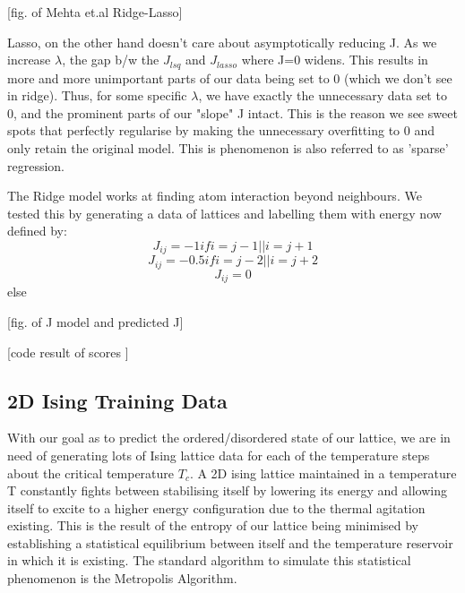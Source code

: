 [fig. of Mehta et.al Ridge-Lasso]

Lasso, on the other hand doesn't care about asymptotically reducing J. As we increase \(\lambda\), the gap b/w the \(J_{lsq}\) and \(J_{lasso}\) where J=0 widens. This results in more and more unimportant parts of our data being set to 0 (which we don't see in ridge). Thus, for some specific \(\lambda\), we have exactly the unnecessary data set to 0, and the prominent parts of our "slope" J intact. This is the reason we see sweet spots that perfectly regularise by making the unnecessary overfitting to 0 and only retain the original model. This is phenomenon is also referred to as 'sparse' regression.

The Ridge model works at finding atom interaction beyond neighbours. We tested this by generating a data of lattices and labelling them with energy now defined by: 
\[J_{ij}=-1 if i=j-1 || i=j+1\]
\[J_{ij}=-0.5 if i=j-2 || i=j+2\]
\[J_{ij}=0\] else

[fig. of J model and predicted J]

[code result of scores ]

\subsection{2D Ising Training Data}
With our goal as to predict the ordered/disordered state of our lattice, we are in need of generating lots of Ising lattice data for each of the temperature steps about the critical temperature \(T_c\). A 2D ising lattice maintained in a temperature T constantly fights between stabilising itself by lowering its energy and allowing itself to excite to a higher energy configuration due to the thermal agitation existing. This is the result of the entropy of our lattice being minimised by establishing a statistical equilibrium between itself and the temperature reservoir in which it is existing. The standard algorithm to simulate this statistical phenomenon is the Metropolis Algorithm.

